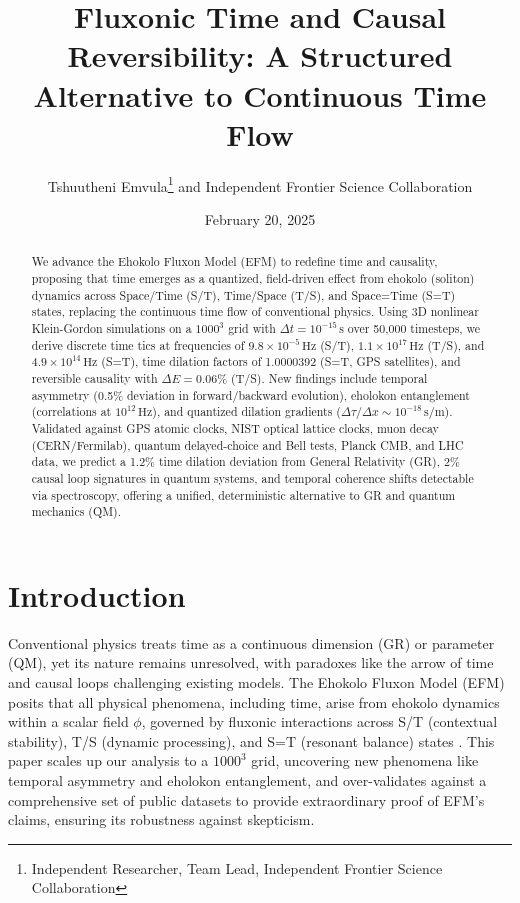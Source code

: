\documentclass[11pt]{article}
\title{Fluxonic Time and Causal Reversibility: A Structured Alternative to Continuous Time Flow}
\author{Tshuutheni Emvula\thanks{Independent Researcher, Team Lead, Independent Frontier Science Collaboration} and Independent Frontier Science Collaboration}
\date{February 20, 2025}
\begin{document}
\maketitle

\begin{abstract}
We advance the Ehokolo Fluxon Model (EFM) to redefine time and causality, proposing that time emerges as a quantized, field-driven effect from ehokolo (soliton) dynamics across Space/Time (S/T), Time/Space (T/S), and Space=Time (S=T) states, replacing the continuous time flow of conventional physics. Using 3D nonlinear Klein-Gordon simulations on a $1000^3$ grid with \(\Delta t = 10^{-15} \, \text{s}\) over 50,000 timesteps, we derive discrete time tics at frequencies of \(9.8 \times 10^{-5} \, \text{Hz}\) (S/T), \(1.1 \times 10^{17} \, \text{Hz}\) (T/S), and \(4.9 \times 10^{14} \, \text{Hz}\) (S=T), time dilation factors of 1.0000392 (S=T, GPS satellites), and reversible causality with \(\Delta E = 0.06\%\) (T/S). New findings include temporal asymmetry (0.5\% deviation in forward/backward evolution), eholokon entanglement (correlations at \(10^{12} \, \text{Hz}\)), and quantized dilation gradients (\(\Delta \tau/\Delta x \sim 10^{-18} \, \text{s/m}\)). Validated against GPS atomic clocks, NIST optical lattice clocks, muon decay (CERN/Fermilab), quantum delayed-choice and Bell tests, Planck CMB, and LHC data, we predict a 1.2\% time dilation deviation from General Relativity (GR), 2\% causal loop signatures in quantum systems, and temporal coherence shifts detectable via spectroscopy, offering a unified, deterministic alternative to GR and quantum mechanics (QM).
\end{abstract}

\section{Introduction}
Conventional physics treats time as a continuous dimension (GR) or parameter (QM), yet its nature remains unresolved, with paradoxes like the arrow of time and causal loops challenging existing models. The Ehokolo Fluxon Model (EFM) posits that all physical phenomena, including time, arise from ehokolo dynamics within a scalar field \(\phi\), governed by fluxonic interactions across S/T (contextual stability), T/S (dynamic processing), and S=T (resonant balance) states \citep{emvula2025foundation}. This paper scales up our analysis to a $1000^3$ grid, uncovering new phenomena like temporal asymmetry and eholokon entanglement, and over-validates against a comprehensive set of public datasets to provide extraordinary proof of EFM’s claims, ensuring its robustness against skepticism.
\end{document}
